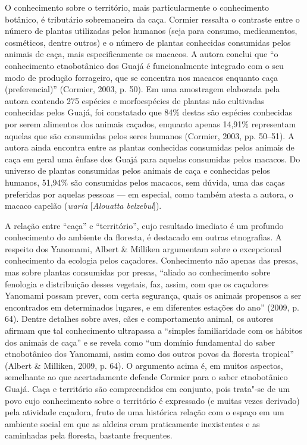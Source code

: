 O conhecimento sobre o território, mais particularmente o conhecimento
botânico, é tributário sobremaneira da caça. Cormier ressalta o
contraste entre o número de plantas utilizadas pelos humanos (seja para
consumo, medicamentos, cosméticos, dentre outros) e o número de plantas
conhecidas consumidas pelos animais de caça, mais especificamente os
macacos. A autora conclui que ``o conhecimento etnobotânico dos Guajá é
funcionalmente integrado com o seu modo de produção forrageiro, que se
concentra nos macacos enquanto caça (preferencial)'' (Cormier, 2003,
p. 50). Em uma amostragem elaborada pela autora contendo 275 espécies e
morfoespécies de plantas não cultivadas conhecidas pelos Guajá, foi
constatado que 84\% destas são espécies conhecidas por serem alimentos
dos animais caçados, enquanto apenas 14,91\% representam aquelas que são
consumidas pelos seres humanos (Cormier, 2003, pp. 50--51). A autora ainda
encontra entre as plantas conhecidas consumidas pelos animais de caça em
geral uma ênfase dos Guajá para aquelas consumidas pelos macacos. Do
universo de plantas consumidas pelos animais de caça e conhecidas pelos
humanos, 51,94\% são consumidas pelos macacos, sem dúvida, uma das caças
preferidas por aquelas pessoas --- em especial, como também atesta a
autora, o macaco capelão (\emph{waria} {[}\emph{Alouatta belzebul}{]}).

A relação entre ``caça'' e ``território'', cujo resultado imediato é um
profundo conhecimento do ambiente da floresta, é destacado em outras
etnografias. A respeito dos Yanomami, Albert \& Milliken argumentam
sobre o excepcional conhecimento da ecologia pelos caçadores.
Conhecimento não apenas das presas, mas sobre plantas consumidas por
presas, ``aliado ao conhecimento sobre fenologia e distribuição desses
vegetais, faz, assim, com que os caçadores Yanomami possam prever, com
certa segurança, quais os animais propensos a ser encontrados em
determinados lugares, e em diferentes estações do ano'' (2009, p. 64).
Dentre detalhes sobre aves, cães e comportamento animal, os autores
afirmam que tal conhecimento ultrapassa a ``simples familiaridade com os
hábitos dos animais de caça'' e se revela como ``um domínio fundamental
do saber etnobotânico dos Yanomami, assim como dos outros povos da
floresta tropical'' (Albert \& Milliken, 2009, p. 64). O argumento acima
é, em muitos aspectos, semelhante ao que acertadamente defende Cormier
para o saber etnobotânico Guajá. Caça e território são compreendidos em
conjunto, pois trata"-se de um povo cujo conhecimento sobre o território
é expressado (e muitas vezes derivado) pela atividade caçadora, fruto de
uma histórica relação com o espaço em um ambiente social em que as
aldeias eram praticamente inexistentes e as caminhadas pela floresta,
bastante frequentes.

